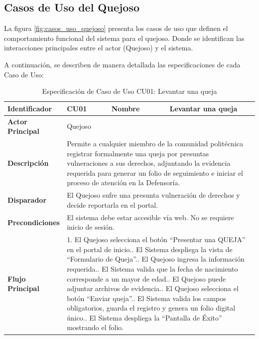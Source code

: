 \subsection{Casos de Uso del Quejoso}
\label{subsec:casos_uso_quejoso}

La figura \ref{fig:casos_uso_quejoso} presenta los casos de uso que definen el comportamiento funcional del sistema para el quejoso. Donde se
identifican las interacciones principales entre el actor (Quejoso) y el sistema.

A continuación, se describen de manera detallada las especificaciones de cada Caso de Uso:

\vspace{0.5cm}

\begingroup
\setlength{\parskip}{0pt}
\begin{longtable}{|p{3.5cm}|p{2cm}|p{2.5cm}|p{7cm}|}
\caption{Especificación de Caso de Uso CU01: Levantar una queja}
\label{tab:cu01_levantar_queja} \\
\hline
\textbf{Identificador} & CU01 & \textbf{Nombre} & Levantar una queja \\ \hline
\textbf{Actor Principal} & \multicolumn{3}{p{11.5cm}|}{Quejoso} \\ \hline
\textbf{Descripción} & \multicolumn{3}{p{11.5cm}|}{Permite a cualquier miembro de la comunidad politécnica registrar formalmente una queja por presuntas vulneraciones a sus derechos, adjuntando la evidencia requerida para generar un folio de seguimiento e iniciar el proceso de atención en la Defensoría.} \\ \hline
\textbf{Disparador} & \multicolumn{3}{p{11.5cm}|}{El Quejoso sufre una presunta vulneración de derechos y decide reportarla en el portal.} \\ \hline
\textbf{Precondiciones} & \multicolumn{3}{p{11.5cm}|}{El sistema debe estar accesible vía web. No se requiere inicio de sesión.} \\ \hline
\textbf{Flujo Principal} & \multicolumn{3}{p{11.5cm}|}{1. El Quejoso selecciona el botón ``Presentar una QUEJA'' en el portal de inicio.\newline 2. El Sistema despliega la vista de ``Formulario de Queja''.\newline 3. El Quejoso ingresa la información requerida.\newline 4. El Sistema valida que la fecha de nacimiento corresponde a un mayor de edad.\newline 5. El Quejoso puede adjuntar archivos de evidencia.\newline 6. El Quejoso selecciona el botón ``Enviar queja''.\newline 7. El Sistema valida los campos obligatorios, guarda el registro y genera un folio digital único.\newline 8. El Sistema despliega la ``Pantalla de Éxito'' mostrando el folio.} \\ \hline

\end{longtable}
